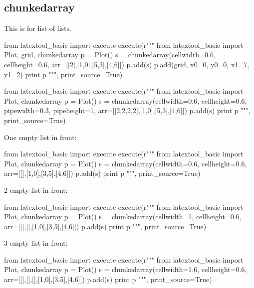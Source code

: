 \subsection{chunkedarray}

This is for list of lists.

\begin{python}
from latextool_basic import execute
execute(r"""
from latextool_basic import Plot, grid, chunkedarray
p = Plot()
s = chunkedarray(cellwidth=0.6,
                 cellheight=0.6,
                 arr=[[2],[1,0],[5,3],[4,6]])
p.add(s)
p.add(grid, x0=0, y0=0, x1=7, y1=2)
print p
""", print_source=True)
\end{python}

\begin{python}
from latextool_basic import execute
execute(r"""
from latextool_basic import Plot, chunkedarray
p = Plot()
s = chunkedarray(cellwidth=0.6,
                 cellheight=0.6,
                 pipewidth=0.3,
                 pipeheight=1,
                 arr=[[2,2,2,2],[1,0],[5,3],[4,6]])
p.add(s)
print p
""", print_source=True)
\end{python}



One empty list in front:
\begin{python}
from latextool_basic import execute
execute(r"""
from latextool_basic import Plot, chunkedarray
p = Plot()
s = chunkedarray(cellwidth=0.6,
                 cellheight=0.6,
                   arr=[[],[1,0],[3,5],[4,6]])
p.add(s)
print p
""", print_source=True)
\end{python}



2 empty list in front:
\begin{python}
from latextool_basic import execute
execute(r"""
from latextool_basic import Plot, chunkedarray
p = Plot()
s = chunkedarray(cellwidth=1,
                 cellheight=0.6,
                   arr=[[],[],[1,0],[3,5],[4,6]])
p.add(s)
print p
""", print_source=True)
\end{python}




3 empty list in front:
\begin{python}
from latextool_basic import execute
execute(r"""
from latextool_basic import Plot, chunkedarray
p = Plot()
s = chunkedarray(cellwidth=1.6,
                 cellheight=0.6,
                 arr=[[],[],[],[1,0],[3,5],[4,6]])
p.add(s)
print p
""", print_source=True)
\end{python}



